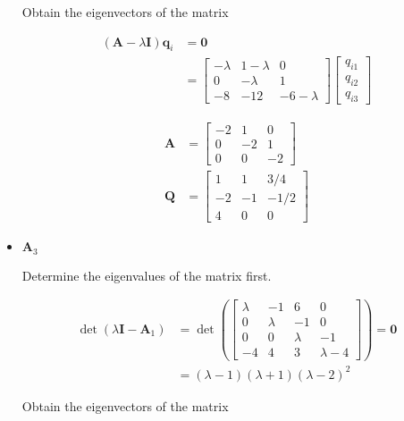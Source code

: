 \begin{itemize}
 Obtain the eigenvectors of the matrix

 \begin{align*}
(\mathbf{A}- \lambda \mathbf{I}) \mathbf{q}_{i} &= \mathbf{0}\\
&=\begin{bmatrix}
 -\lambda & 1-\lambda & 0\\
 0 & -\lambda & 1\\
 -8 & -12 & -6 -\lambda
\end{bmatrix}
\begin{bmatrix}
 q_{i1}\\q_{i2}\\q_{i3}
\end{bmatrix}
 \end{align*}

   \begin{align*}
 \hat {\mathbf{A}} &= \begin{bmatrix}
                       -2 & 1 & 0\\
                       0 & -2 & 1\\
                       0 & 0 & -2
                      \end{bmatrix}\\
  \mathbf{Q} &= \begin{bmatrix}
                    1 & 1 & 3/4\\
                    -2 & -1 & -1/2\\
                    4 & 0 & 0
  \end{bmatrix}
 \end{align*}

 \item $\mathbf{A}_3$

 Determine the eigenvalues of the matrix first.

  \begin{align*}
  \det(\lambda \mathbf{I} - \mathbf{A}_1) &=
  \det\left(\begin{bmatrix}
       \lambda & -1 & 6 & 0\\
       0 & \lambda & -1 & 0\\
       0 & 0 & \lambda & -1\\
       -4 & 4 & 3 & \lambda -4
      \end{bmatrix}\right)=\mathbf{0}\\
      &= (\lambda -1) (\lambda +1) (\lambda -2)^2
 \end{align*}

 Obtain the eigenvectors of the matrix


\end{itemize}

